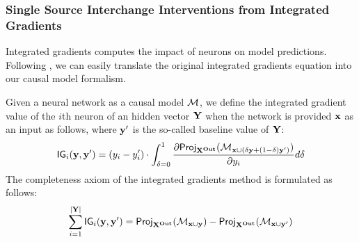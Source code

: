 \documentclass[twoside,11pt]{article}
\begin{document}
    \centerline{ }
 

\subsubsection{Single Source Interchange Interventions from Integrated Gradients}

Integrated gradients \citep{sundararajan2017axiomatic} computes the impact of neurons on model predictions. Following \cite{geiger2021causal}, we can easily translate the original integrated gradients equation into our causal model formalism.

\begin{definition}
Given a neural network as a causal model $\mathcal{M}$, we define the integrated gradient value of the $i$th neuron of an hidden vector $\mathbf{Y}$ when the network is provided $\mathbf{x}$ as an input as follows, where $\mathbf{y}'$ is the so-called baseline value of $\mathbf{Y}$:
\[\mathsf{IG}_i(\mathbf{y}, \mathbf{y}') = (y_i - y'_i) \cdot \int_{\delta = 0}^1 \frac{\partial \mathsf{Proj}_{\mathbf{X}^{\mathbf{Out}}}(\mathcal{M}_{\mathbf{x}\cup (\delta\mathbf{y}+(1-\delta)\mathbf{y}')})}{\partial y_i} d\delta\]
The completeness axiom of the integrated gradients method is formulated as follows:
\[\sum_{i=1}^{|\mathbf{Y}|} \mathsf{IG}_i(\mathbf{y}, \mathbf{y}') = \mathsf{Proj}_{\mathbf{X}^{\mathbf{Out}}}(\mathcal{M}_{\mathbf{x} \cup \mathbf{y}}) - \mathsf{Proj}_{ \mathbf{X}^{\mathbf{Out}}}(\mathcal{M}_{\mathbf{x} \cup \mathbf{y}'})\]
\end{definition}
\end{document}
